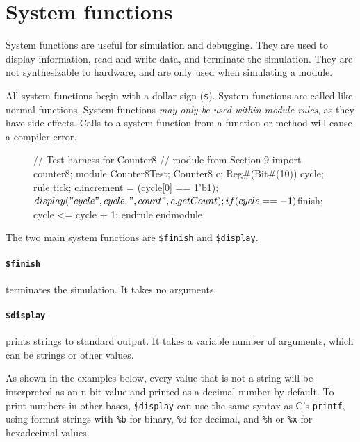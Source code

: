 \section{System functions}
\label{sec:systemFunctions}

System functions are useful for simulation and debugging. 
They are used to display information, read and write data,
and terminate the simulation.
They are not synthesizable to hardware,
and are only used when simulating a module.

All system functions begin with a dollar sign (\verb|$|).
System functions are called like normal functions.
System functions \emph{may only be used within module rules}, as they have side effects.
Calls to a system function from a function or method will cause a compiler error.

\begin{wrapfigure}{r}{0.32\columnwidth}
\vspace{-6em}
\begin{mscode}
// Test harness for Counter8
// module from Section 9
import counter8;
module Counter8Test;
  Counter8 c;
  Reg#(Bit#(10)) cycle;
  rule tick;
    c.increment =
     (cycle[0] == 1'b1);
    $display("cycle ", cycle,
     ", count ", c.getCount);
    if (cycle == -1) $finish;
    cycle <= cycle + 1;
  endrule
endmodule
\end{mscode}
\vspace{-6em}
\end{wrapfigure}

The two main system functions are \verb|$finish| and \verb|$display|.

\paragraph{\texttt{\$finish}} terminates the simulation. It takes no arguments.

\paragraph{\texttt{\$display}} prints strings to standard output.
It takes a variable number of arguments, which can be strings or other values.

As shown in the examples below, every value that is not a string will be interpreted as an n-bit value and printed as a decimal number by default.
To print numbers in other bases, \verb|$display| can use the same syntax as C's \verb|printf|,
using format strings with \verb|%b| for binary, \verb|%d| for decimal, and \verb|%h| or \verb|%x| for hexadecimal values.

